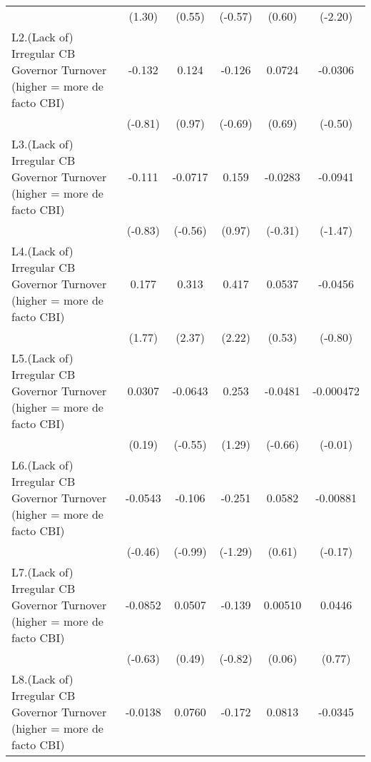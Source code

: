 {\begin{longtable}{l*{5}{c}}
                &   (1.30)         &   (0.55)         &  (-0.57)         &   (0.60)         &  (-2.20)         \\
\addlinespace
L2.(Lack of) Irregular CB Governor Turnover (higher = more de facto CBI)&   -0.132         &    0.124         &   -0.126         &   0.0724         &  -0.0306         \\
                &  (-0.81)         &   (0.97)         &  (-0.69)         &   (0.69)         &  (-0.50)         \\
\addlinespace
L3.(Lack of) Irregular CB Governor Turnover (higher = more de facto CBI)&   -0.111         &  -0.0717         &    0.159         &  -0.0283         &  -0.0941         \\
                &  (-0.83)         &  (-0.56)         &   (0.97)         &  (-0.31)         &  (-1.47)         \\
\addlinespace
L4.(Lack of) Irregular CB Governor Turnover (higher = more de facto CBI)&    0.177         &    0.313\sym{*}  &    0.417\sym{*}  &   0.0537         &  -0.0456         \\
                &   (1.77)         &   (2.37)         &   (2.22)         &   (0.53)         &  (-0.80)         \\
\addlinespace
L5.(Lack of) Irregular CB Governor Turnover (higher = more de facto CBI)&   0.0307         &  -0.0643         &    0.253         &  -0.0481         &-0.000472         \\
                &   (0.19)         &  (-0.55)         &   (1.29)         &  (-0.66)         &  (-0.01)         \\
\addlinespace
L6.(Lack of) Irregular CB Governor Turnover (higher = more de facto CBI)&  -0.0543         &   -0.106         &   -0.251         &   0.0582         & -0.00881         \\
                &  (-0.46)         &  (-0.99)         &  (-1.29)         &   (0.61)         &  (-0.17)         \\
\addlinespace
L7.(Lack of) Irregular CB Governor Turnover (higher = more de facto CBI)&  -0.0852         &   0.0507         &   -0.139         &  0.00510         &   0.0446         \\
                &  (-0.63)         &   (0.49)         &  (-0.82)         &   (0.06)         &   (0.77)         \\
\addlinespace
L8.(Lack of) Irregular CB Governor Turnover (higher = more de facto CBI)&  -0.0138         &   0.0760         &   -0.172         &   0.0813         &  -0.0345         \\

\end{longtable}}

